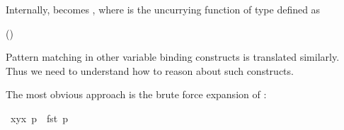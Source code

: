 \begin{isabellebody}
\begin{isamarkuptext}
Internally,  becomes , where
 is the uncurrying function of type  defined as
\begin{center}
\hfill()
\end{center}
Pattern matching in
other variable binding constructs is translated similarly. Thus we need to
understand how to reason about such constructs.%
\end{isamarkuptext}%
\isamarkuptrue%
%
\isamarkuptrue%
%
\begin{isamarkuptext}%
The most obvious approach is the brute force expansion of :%
\end{isamarkuptext}%
\isamarkuptrue%
\isamarkupfalse%
\ {}{}{}{}x{}y{}{}x{}\ p\ {}\ fst\ p{}\isanewline
%
\isadelimproof

\end{isabellebody}
